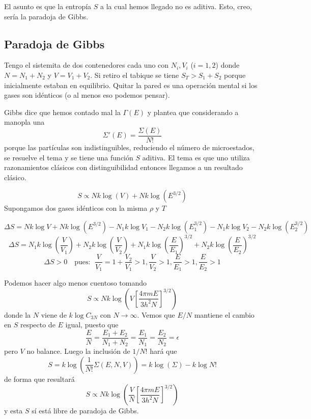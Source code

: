 \documentclass[10pt,oneside]{CBFT_book}
\begin{document}
El asunto es que la entropía $S$ a la cual hemos llegado no es aditiva. Esto, creo, sería la paradoja de Gibbs.

\subsection{Paradoja de Gibbs}

Tengo el sistemita de dos contenedores cada uno con $N_i, V_i$ ($i=1,2$) donde $N=N_1+N_2$ y $V=V_1+V_2$.
Si retiro el tabique se tiene $S_T > S_1 + S_2$ porque inicialmente estaban en equilibrio.
Quitar la pared es una operación mental si los gases son idénticos (o al menos eso podemos pensar).

Gibbs dice que hemos contado mal la $\Gamma(E)$ y plantea que considerando a manopla una
\[
	\Sigma'(E) = \frac{\Sigma(E)}{N!}
\]
porque las partículas son indistinguibles, reduciendo el número de microestados, se resuelve el tema y se
tiene una función $S$ aditiva.
El tema es que uno utiliza razonamientos clásicos con distinguibilidad entonces llegamos a un resultado
clásico.

\[
	S \propto Nk\log(V) + Nk \log (E^{3/2})
\]
Supongamos dos gases idénticos con la misma $\rho$ y $T$


\[
	\Delta S = Nk \log V + Nk \log (E^{3/2}) - N_1k \log V_1 - N_2k \log (E_1^{3/2})
	- N_1k \log V_2 - N_2k \log (E_2^{3/2})
\]
\[
	\Delta S = N_1 k \log \left( \frac{V}{V_1} \right) + N_2 k \log \left( \frac{V}{V_2} \right) +
		N_1 k \log \left( \frac{E}{E_1} \right)^{3/2} + N_2 k \log \left( \frac{E}{E_2} \right)^{3/2}
\]
\[
	\Delta S > 0 \quad \text{pues: } \; \frac{V}{V_1} = 1 + \frac{V_2}{V_1} > 1, \frac{V}{V_2} > 1, 
	\frac{E}{E_1} > 1, \frac{E}{E_2} > 1
\]

Podemos hacer algo menos cuentoso tomando
\[
	S \propto Nk\log \left( V\left[ \frac{4\pi m E}{3 h^2 N} \right]^{3/2} \right)
\]
donde la $N$ viene de $k\log C_{3N}$ con $N \to \infty$. Vemos que $E/N$ mantiene el cambio en $S$ respecto de $E$
igual, puesto que 
\[
	\frac{E}{N} = \frac{E_1 + E_2}{N_1 + N_2} = \frac{E_1}{N_1} = \frac{E_2}{N_2} = \epsilon
\]
pero $V$ no balance. Luego la inclusión de $1/N!$ hará que 
\[
	S = k \log (\frac{1}{N!}\Sigma(E,N,V)) = k \log (\Sigma) - k\log N!
\]
de forma que resultará
\[
	S \propto Nk\log \left( \frac{V}{N}\left[ \frac{4\pi m E}{3 h^2 N} \right]^{3/2} \right)
\]
y esta $S$ sí está libre de paradoja de Gibbs.
\end{document}
